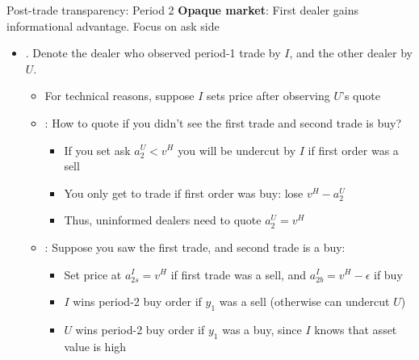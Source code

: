 \documentclass[english,10pt
,aspectratio=169
]{beamer}
\begin{document}
\begin{frame}{Post-trade transparency: Period 2}
	\textbf{Opaque market}: First dealer gains informational advantage. Focus on \alert{ask side}
	\begin{itemize}
		\item {}. Denote the dealer who observed period-1 trade by \alert{$I$}, and the other dealer by \alert{$U$}.
		\begin{itemize}
			\item For technical reasons, suppose $I$ sets price after observing $U$'s quote
			\item {}: How to quote if you didn't see the first trade and second trade is buy? 
			\begin{itemize}
				\item If you set ask $a^U_2<v^{H}$ you will be undercut by $I$  if first order was a sell
				\item You only get to trade if first order was buy: lose $v^{H}-a^U_2$
				\item Thus, uninformed dealers need to quote $a^U_2=v^{H}$
			\end{itemize}
			\item {}: Suppose you saw the first trade, and second trade is a buy:
			\begin{itemize}
				\item Set price at $a^I_{2s}=v^{H}$ if first trade was a sell, and $a^I_{2b} = v^H - \epsilon$ if buy
				\item  $I$ wins period-2 buy order if $y_1$ was a sell (otherwise can undercut $U$)
				\item  $U$ wins period-2 buy order if $y_1$ was a buy, since $I$ knows that asset value is high
			\end{itemize}
		\end{itemize}
	\end{itemize}
\end{frame}
\end{document}
